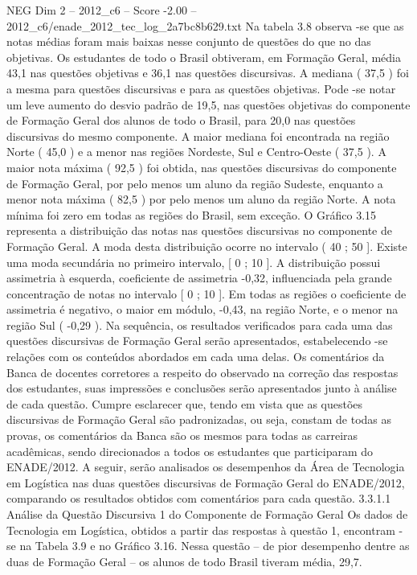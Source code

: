 \begin{textsample}{NEG Dim 2 – 2012\_c6 – Score -2.00 – 2012\_c6/enade\_2012\_tec\_log\_2a7bc8b629.txt}
Na tabela 3.8 observa -se que as notas médias foram mais baixas nesse conjunto de questões do que no das objetivas.
Os estudantes de todo o Brasil obtiveram, em Formação Geral, média 43,1 nas questões objetivas e 36,1 nas questões discursivas.
A mediana ( 37,5 ) foi a mesma para questões discursivas e para as questões objetivas.
Pode -se notar um leve aumento do desvio padrão de 19,5, nas questões objetivas do componente de Formação Geral dos alunos de todo o Brasil, para 20,0 nas questões discursivas do mesmo componente.
A maior mediana foi encontrada na região Norte ( 45,0 ) e a menor nas regiões Nordeste, Sul e Centro-Oeste ( 37,5 ).
A maior nota máxima ( 92,5 ) foi obtida, nas questões discursivas do componente de Formação Geral, por pelo menos um aluno da região Sudeste, enquanto a menor nota máxima ( 82,5 ) por pelo menos um aluno da região Norte.
A nota mínima foi zero em todas as regiões do Brasil, sem exceção.
O Gráfico 3.15 representa a distribuição das notas nas questões discursivas no componente de Formação Geral.
A moda desta distribuição ocorre no intervalo ( 40 ; 50 ].
Existe uma moda secundária no primeiro intervalo, [ 0 ; 10 ].
A distribuição possui assimetria à esquerda, coeficiente de assimetria -0,32, influenciada pela grande concentração de notas no intervalo [ 0 ; 10 ].
Em todas as regiões o coeficiente de assimetria é negativo, o maior em módulo, -0,43, na região Norte, e o menor na região Sul ( -0,29 ).
Na sequência, os resultados verificados para cada uma das questões discursivas de Formação Geral serão apresentados, estabelecendo -se relações com os conteúdos abordados em cada uma delas.
Os comentários da Banca de docentes corretores a respeito do observado na correção das respostas dos estudantes, suas impressões e conclusões serão apresentados junto à análise de cada questão.
Cumpre esclarecer que, tendo em vista que as questões discursivas de Formação Geral são padronizadas, ou seja, constam de todas as provas, os comentários da Banca são os mesmos para todas as carreiras acadêmicas, sendo direcionados a todos os estudantes que participaram do ENADE/2012.
A seguir, serão analisados os desempenhos da Área de Tecnologia em Logística nas duas questões discursivas de Formação Geral do ENADE/2012, comparando os resultados obtidos com comentários para cada questão. 3.3.1.1 Análise da Questão Discursiva 1 do Componente de Formação Geral Os dados de Tecnologia em Logística, obtidos a partir das respostas à questão 1, encontram -se na Tabela 3.9 e no Gráfico 3.16.
Nessa questão – de pior desempenho dentre as duas de Formação Geral – os alunos de todo Brasil tiveram média, 29,7.

\end{textsample}
